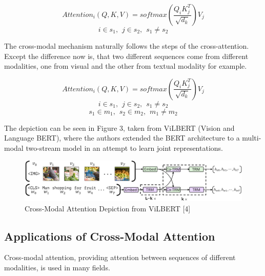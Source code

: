 \documentclass{article}
\begin{document}
\[Attention_i(Q, K, V) = softmax(\frac{Q_iK_j^T}{\sqrt{d_k}})V_j\]
\[i \in s_1, \hspace{5pt} j \in s_2, \hspace{5pt} s_1 \neq s_2\]

The cross-modal mechanism naturally follows the steps of the cross-attention. Except the difference now is, that two different sequences come from different modalities, one from visual and the other from textual modality for example. 

\[Attention_i(Q, K, V) = softmax(\frac{Q_iK_j^T}{\sqrt{d_k}})V_j\]
\[i \in s_1, \hspace{5pt} j \in s_2, \hspace{5pt} s_1 \neq s_2\]
\[s_1 \in m_1, \hspace{5pt} s_2 \in m_2, \hspace{5pt} m_1 \neq m_2\]

The depiction can be seen in Figure 3, taken from ViLBERT (Vision and Language BERT), where the authors extended the BERT architecture to a multi-modal two-stream model in an attempt to learn joint representations.

\begin{figure}
    \centering
    \includegraphics[width=1\linewidth]{ViLBERT.png}
    \caption{Cross-Modal Attention Depiction from ViLBERT [4]}
    \label{fig:enter-label}
\end{figure}

\subsection{Applications of Cross-Modal Attention}

Cross-modal attention, providing attention between sequences of different modalities, is used in many fields.
\end{document}
